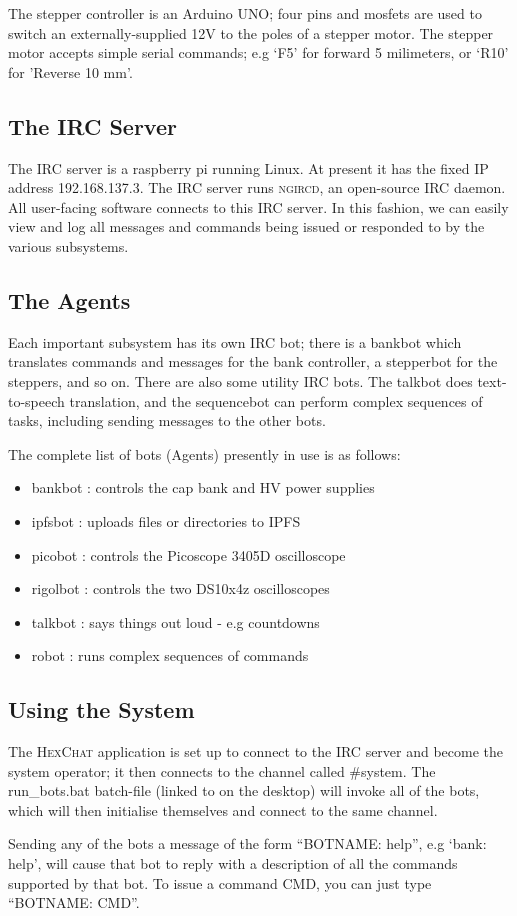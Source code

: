 The stepper controller is an Arduino UNO; four pins and mosfets are used to switch an externally-supplied 12V to the poles of a stepper motor. The stepper motor accepts simple serial commands; e.g `F5' for forward 5 milimeters, or `R10' for 'Reverse 10 mm'.

\subsection{The IRC Server}

The IRC server is a raspberry pi running Linux. At present it has the fixed IP address 192.168.137.3.
The IRC server runs \textsc{ngircd}, an open-source IRC daemon. All user-facing software connects
to this IRC server. In this fashion, we can easily view and log all messages and commands being issued
or responded to by the various subsystems.

\subsection{The Agents}

Each important subsystem has its own IRC bot; there is a bankbot which translates commands and messages for the bank controller, a stepperbot for the steppers, and so on. There are also some utility IRC bots. The talkbot does text-to-speech translation, and the sequencebot can perform complex sequences of tasks,
including sending messages to the other bots.

The complete list of bots (Agents) presently in use is as follows:

\begin{itemize}
 \item{bankbot  : controls the cap bank and HV power supplies }
 \item{ipfsbot  : uploads files or directories to IPFS }
 \item{picobot  : controls the Picoscope 3405D oscilloscope }
 \item{rigolbot : controls the two DS10x4z oscilloscopes }
 \item{talkbot  : says things out loud - e.g countdowns }
 \item{robot    : runs complex sequences of commands }
\end{itemize}

\subsection{Using the System}

The \textsc{HexChat} application is set up to connect to the IRC server and become the system operator;
it then connects to the channel called \#system. The run\_bots.bat batch-file (linked to on the desktop) will
invoke all of the bots, which will then initialise themselves and connect to the same channel.

Sending any of the bots a message of the form ``BOTNAME: help'', e.g `bank: help', will cause
that bot to reply with a description of all the commands supported by that bot. To issue a command CMD, you can just type ``BOTNAME: CMD''.
